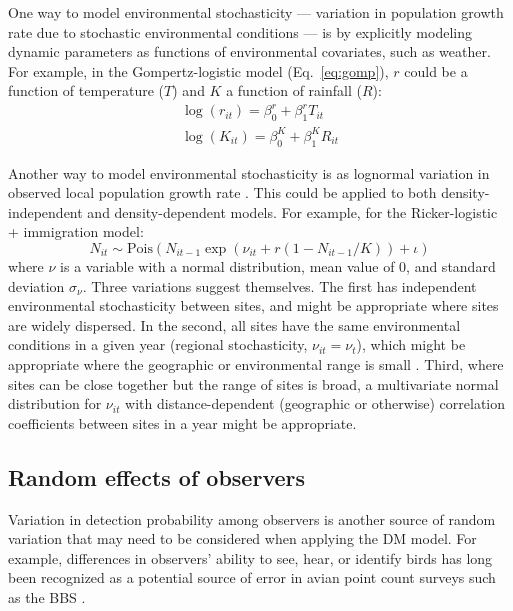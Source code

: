\documentclass[12pt]{article}
\begin{document}
One way to model environmental stochasticity --- variation in population growth
rate due to stochastic environmental conditions --- is by explicitly
modeling dynamic parameters as functions of environmental covariates, such
as weather.  For example, in the Gompertz-logistic model (Eq.~\ref{eq:gomp}), $r$ could be a 
function of temperature ($T$) and $K$ a function of rainfall ($R$):
\begin{gather}
\log(r_{it}) = \beta^{r}_{0} + \beta^{r}_{1}T_{it} \nonumber \\
\log(K_{it}) = \beta^{K}_{0} + \beta^{K}_{1}R_{it}  
\label{eq:weather}
\end{gather}

Another way to model environmental stochasticity is as lognormal variation in observed local population 
growth rate \citep{bjornstad:2001,bonsall_hastings:2004}.  This could be applied to both density-independent and density-dependent models.
For example, for the Ricker-logistic + immigration model:
\begin{equation}
N_{it} \sim
\text{Pois}(N_{it-1}\exp(\nu_{it} + r(1-N_{it-1}/K)) + \iota)
\label{eq:nuRand}
\end{equation}
where $\nu$ is a variable with a normal distribution, mean value of 0, and standard deviation $\sigma_\nu$.  
Three variations suggest themselves.  The first has independent environmental stochasticity 
between sites, and might be appropriate where sites are widely dispersed.  In the second, 
all sites have the same environmental conditions in a given year (regional stochasticity, $\nu_{it} = \nu_{t}$),
which might be appropriate where the geographic or environmental range is small \citep{hanski:1998}.  
Third, where sites can be close together but the range of sites is broad, a multivariate normal distribution 
for $\nu_{it}$ with distance-dependent (geographic or otherwise) correlation coefficients
between sites in a year might be appropriate.

\subsection{Random effects of observers}

Variation in detection probability among observers is another
source of random variation that may need to be considered when applying
the DM model. For example, differences in observers' ability to see,
hear, or identify birds has long been recognized as a potential source of error
in avian point count surveys such as the BBS 
\citep{robbins_etal:1986,sauer_etal:1994auk,campbell_francis:2011}.%
\end{document}
